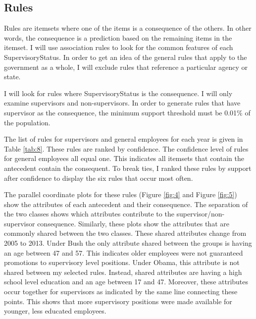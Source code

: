 \documentclass{article}
\begin{document}
    \subsection{Rules}
    Rules are itemsets where one of the items is a consequence of the others. In other words, the consequence is a prediction based on the remaining items in the itemset. I will use association rules to look for the common features of each SupervisoryStatus. In order to get an idea of the general rules that apply to the government as a whole, I will exclude rules that reference a particular agency or state.
    \par
    I will look for rules where SupervisoryStatus is the consequence. I will only examine supervisors and non-supervisors. In order to generate rules that have supervisor as the consequence, the minimum support threshold must be 0.01\% of the population.
    \par
    The list of rules for supervisors and general employees for each year is given in Table \ref{tab:8}. These rules are ranked by confidence. The confidence level of rules for general employees all equal one. This indicates all itemsets that contain the antecedent contain the consequent. To break ties, I ranked these rules by support after confidence to display the six rules that occur most often.
    \par
    The parallel coordinate plots for these rules (Figure \ref{fig:4} and Figure \ref{fig:5}) show the attributes of each antecedent and their consequence. The separation of the two classes shows which attributes contribute to the supervisor/non-supervisor consequence. Similarly, these plots show the attributes that are commonly shared between the two classes. These shared attributes change from 2005 to 2013. Under Bush the only attribute shared between the groups is having an age between 47 and 57. This indicates older employees were not guaranteed promotions to supervisory level positions. Under Obama, this attribute is not shared between my selected rules. Instead, shared attributes are having a high school level education and an age between 17 and 47. Moreover, these attributes occur together for supervisors as indicated by the same line connecting these points. This shows that more supervisory positions were made available for younger, less educated employees.
\end{document}
